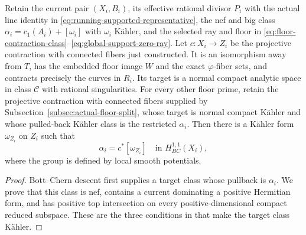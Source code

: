 \begin{claim}
\label{claim:outer-target-positivity}
Retain the current pair \((X_i,B_i)\), its effective rational divisor
\(P_i\) with the actual line identity in
\eqref{eq:running-supported-representative}, the nef and big class
\(\alpha_i=c_1(A_i)+[\omega_i]\) with \(\omega_i\) K\"ahler, and the
selected ray and floor in
\eqref{eq:floor-contraction-class}--\eqref{eq:global-support-zero-ray}.
Let \(c:X_i\to Z_i\) be the projective contraction with connected fibers
just constructed.  It is an isomorphism away from \(T\), has the embedded
floor image \(W\) and the exact \(\varphi\)-fiber sets, and contracts
precisely the curves in \(R_i\).  Its target is a normal compact analytic
space in class \(\mathcal C\) with rational singularities.  For every other floor prime,
retain the projective contraction with connected fibers supplied by
Subsection~\ref{subsec:actual-floor-split}, whose target is normal compact
K\"ahler and whose pulled-back K\"ahler class is the restricted
\(\alpha_i\).
Then there is a K\"ahler form \(\omega_{Z_i}\) on \(Z_i\) such that
\begin{equation}\label{eq:outer-target-kahler}
 \alpha_i=c^*[\omega_{Z_i}]
 \quad\text{in }H^{1,1}_{BC}(X_i),
\end{equation}
where the group is defined by local smooth potentials.
\end{claim}
\begin{proof}
Bott--Chern descent first supplies a target class whose pullback is
\(\alpha_i\).  We prove that this class is nef, contains a current
dominating a positive Hermitian form, and has positive top intersection
on every positive-dimensional compact reduced subspace.  These are the
three conditions in \cite[Theorem~2.29]{DasHaconPaun2024} that make the
target class K\"ahler.

\end{proof}

